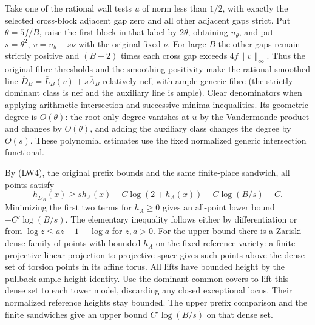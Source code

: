 Take one of the rational wall tests \(u\) of norm less than
\(1/2\), with exactly the selected cross-block adjacent gap
zero and all other adjacent gaps strict. Put \(\theta=5f/B\),
raise the first block in that label by \(2\theta\), obtaining
\(u_\theta\), and put \(s=\theta^2,\ v=u_\theta-s\nu\)
with the original fixed \(\nu\).
For large \(B\) the other gaps remain strictly positive and
\((B-2)\) times each cross gap exceeds \(4f\|v\|_\infty\).
Thus the original fibre thresholds and the smoothing
positivity make the rational smoothed line
\(\overline D_B=\overline L_B(v)+s\overline A_B\)
relatively nef, with ample generic fibre (the strictly
dominant class is nef and the auxiliary line is ample).
Clear denominators when applying arithmetic intersection
and successive-minima inequalities. Its geometric degree
is \(O(\theta)\): the root-only degree vanishes at \(u\)
by the Vandermonde product and changes by \(O(\theta)\),
and adding the auxiliary class changes the degree by
\(O(s)\). These polynomial estimates use the fixed
normalized generic intersection functional.

By (LW4), the original prefix bounds and the same
finite-place sandwich, all points satisfy
\[
 h_{\overline D_B}(x)\ge s h_A(x)-C\log(2+h_A(x))
                       -C\log(B/s)-C.
\]
Minimizing the first two terms for \(h_A\ge0\) gives an
all-point lower bound \(-C'\log(B/s)\). The elementary
inequality follows either by differentiation or from
\(\log z\le az-1-\log a\) for \(z,a>0\).
For the upper bound there is a Zariski dense family of
points with bounded \(h_A\) on the fixed reference variety:
a finite projective linear projection to projective
space gives such points above the dense set of torsion
points in its affine torus. All lifts have bounded
height by the pullback ample height identity. Use the
dominant common covers to lift this dense set to each
tower model, discarding any closed exceptional locus.
Their normalized reference heights stay bounded.
The upper prefix comparison and the finite sandwiches
give an upper bound \(C'\log(B/s)\) on that dense set.

